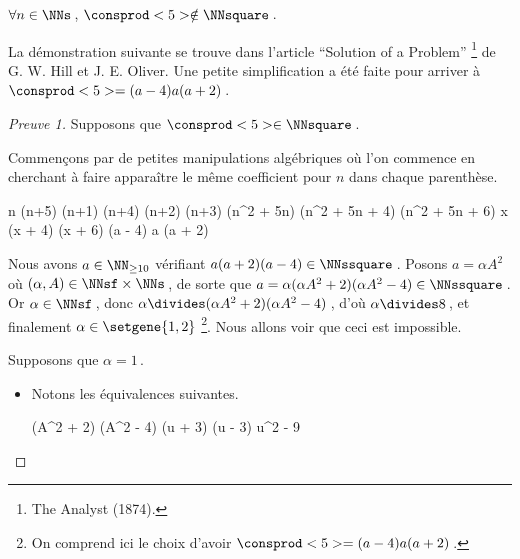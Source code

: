 \begin{fact} \label{case-6}
	 $\forall n \in \NNs$\,, $\consprod<5> \notin \NNsquare$\,.
\end{fact}




La démonstration suivante se trouve dans l'article \enquote{Solution of a Problem}
\footnote{
	The Analyst (1874).
}
de G. W. Hill et J. E. Oliver.
Une petite simplification a été faite pour arriver à $\consprod<5> = (a - 4) a (a + 2)$\,.


\begin{proof}[Preuve 1]%
    Supposons que $\consprod<5> \in \NNsquare$\,.
    
    \smallskip
    
    Commençons par de petites manipulations algébriques où l'on commence en cherchant à faire apparaître le même coefficient pour $n$ dans chaque parenthèse.
    
    \medskip
    \begin{stepcalc}[style = sar]
	\explnext{}
		n (n+5) \cdot (n+1) (n+4) \cdot (n+2) (n+3)
	\explnext{}
		(n^2 + 5n) (n^2 + 5n + 4) (n^2 + 5n + 6)
		x (x + 4) (x + 6)
		(a - 4) a (a + 2)
    \end{stepcalc}
  
    \medskip
    Nous avons $a \in \NN_{\geq 10}$ vérifiant $a (a + 2) (a - 4) \in \NNssquare$\,. 
    Posons $a = \alpha A^2$ où $(\alpha, A) \in \NNsf \times \NNs$\,,
    de sorte que $a = \alpha (\alpha A^2 + 2) (\alpha A^2 - 4) \in \NNssquare$\,.
    Or $\alpha\in \NNsf$\,, donc $\alpha \divides (\alpha A^2 + 2) (\alpha A^2 - 4)$\,, 
    d'où $\alpha \divides 8$\,, et finalement $\alpha \in \setgene{1, 2}$
    \footnote{
    	On comprend ici le choix d'avoir $\consprod<5> = (a - 4) a (a + 2)$\,.
    }.
    Nous allons voir que ceci est impossible.
    
    \medskip
    
    Supposons que $\alpha = 1$\,.
    
    \begin{itemize}
    	\item Notons les équivalences suivantes.
        
        \noindent\kern-6pt%
        \begin{stepcalc}[style=ar*, ope=\iff]
        	(A^2 + 2) (A^2 - 4) \in \NNssquare
        	(u + 3) (u - 3) \in \NNssquare
    	\explnext{}
        	u^2 - 9 \in \NNssquare
        \end{stepcalc}


\end{itemize}
\end{proof}
